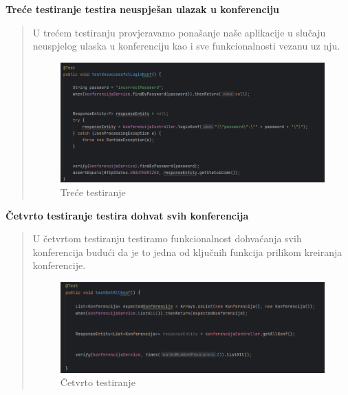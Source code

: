 \begin{packed_enum}
				\item\textbf{Treće testiranje testira neuspješan ulazak u konferenciju}
				\begin{quote}
					U trećem testiranju provjeravamo ponašanje naše aplikacije u slučaju neuspjelog ulaska u konferenciju kao i sve funkcionalnosti vezanu uz nju.
					\begin{figure}[H]
						\includegraphics[width=\textwidth]{slike/JUnit3.png} %
						\caption{Treće testiranje}
						\label{fig:JUnit3} %
					\end{figure}
				\end{quote}
				
				\item\textbf{Četvrto testiranje testira dohvat svih konferencija}
				\begin{quote}
					U četvrtom testiranju testiramo funkcionalnost dohvaćanja svih konferencija budući da je to jedna od ključnih funkcija prilikom kreiranja konferencije.
					\begin{figure}[H]
						\includegraphics[width=\textwidth]{slike/JUnit4.png} %
						\caption{Četvrto testiranje}
						\label{fig:JUnit4} %
					\end{figure}
				\end{quote}
				

\end{packed_enum}
